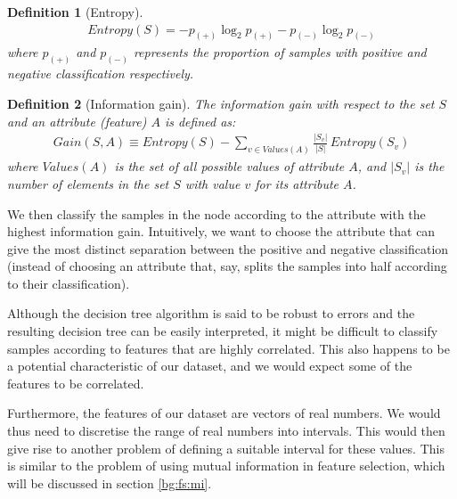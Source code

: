 \documentclass[12pt, twoside, a4paper]{report}
\begin{document}
\newtheorem{mydef}{Definition}[subsection]

\begin{mydef}[Entropy]
\begin{align*}
Entropy(S) = -p_{(+)} \log_2 p_{(+)} - p_{(-)} \log_2 p_{(-)}
\end{align*}
where $p_{(+)}$ and $p_{(-)}$ represents the proportion of samples with positive and negative classification respectively.\\
\end{mydef}

\begin{mydef}[Information gain]
The information gain with respect to the set $S$ and an attribute (feature) $A$ is defined as:
\begin{align*}
Gain(S, A) \equiv Entropy(S) - \sum_{v \in Values(A)} \frac{|S_v|}{|S|} \, Entropy(S_v)
\end{align*}
where $Values(A)$ is the set of all possible values of attribute $A$, and $|S_v|$ is the number of elements in the set $S$ with value $v$ for its attribute $A$.
\end{mydef}

We then classify the samples in the node according to the attribute with the highest information gain. Intuitively, we want to choose the attribute that can give the most distinct separation between the positive and negative classification (instead of choosing an attribute that, say, splits the samples into half  according to their classification).

Although the decision tree algorithm is said to be robust to errors \cite{RefWorks:98} and the resulting decision tree can be easily interpreted, it might be difficult to classify samples according to features that are highly correlated. This also happens to be a potential characteristic of our dataset, and we would expect some of the features to be correlated.

Furthermore, the features of our dataset are vectors of real numbers. We would thus need to discretise the range of real numbers into intervals. This would then give rise to another problem of defining a suitable interval for these values. This is similar to the problem of using mutual information in feature selection, which will be discussed in section \ref{bg:fs:mi}.
\end{document}
